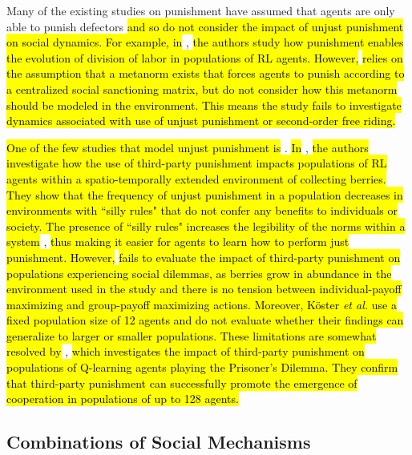 \documentclass[sn-aps,numbered]{sn-jnl}%
\theoremstyle{thmstyleone}%
\theoremstyle{thmstyletwo}%
\theoremstyle{thmstylethree}%
\begin{document}
Many of the existing studies on punishment \citep{Redhead2021, boyd1992punishment, division_of_labour, stable_metapunish} have assumed that agents are only able to punish defectors \hl{and so do not consider the impact of unjust punishment on social dynamics. For example, in} \citep{division_of_labour}, \hl{the authors study how punishment enables the evolution of division of labor in populations of RL agents. However,} \citep{division_of_labour} \hl{relies on the assumption that a metanorm exists that forces agents to punish according to a centralized social sanctioning matrix, but do not consider how this metanorm should be modeled in the environment. This means the study fails to investigate dynamics associated with use of unjust punishment or second-order free riding.}

\hl{One of the few studies that model unjust punishment is} \citep{silly_rules_ssd}. \hl{In} \citep{silly_rules_ssd}, \hl{the authors investigate how the use of third-party punishment impacts populations of RL agents within a spatio-temporally extended environment of collecting berries. They show that the frequency of unjust punishment in a population decreases in environments with ``silly rules" that do not confer any benefits to individuals or society. The presence of ``silly rules" increases the legibility of the norms within a system} \citep{legible_normativity_hadfield}, \hl{thus making it easier for agents to learn how to perform just punishment. However,} \citep{silly_rules_ssd} \hl{fails to evaluate the impact of third-party punishment on populations experiencing social dilemmas, as berries grow in abundance in the environment used in the study and there is no tension between individual-payoff maximizing and group-payoff maximizing actions. Moreover, K\"oster \textit{et al.} use a fixed population size of 12 agents and do not evaluate whether their findings can generalize to larger or smaller populations. These limitations are somewhat resolved by} \cite{learning_to_penalise_other_agents}, \hl{which investigates the impact of third-party punishment on populations of Q-learning agents playing the Prisoner's Dilemma. They confirm that third-party punishment can successfully promote the emergence of cooperation in populations of up to 128 agents.}

\subsection{Combinations of Social Mechanisms}
\end{document}
